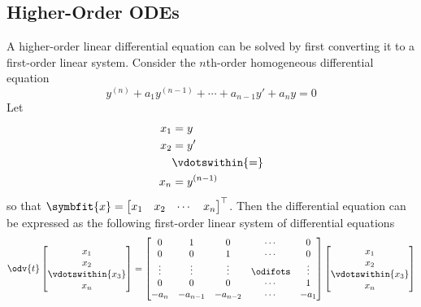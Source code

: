 \documentclass{article}
\begin{document}
\subsection{Higher-Order ODEs}
A higher-order linear differential equation can be solved by first converting it to a first-order linear
system. Consider the \(n\)th-order homogeneous differential equation
\begin{equation*}
    y^{\left( n \right)} + a_1 y^{\left( n-1 \right)} + \cdots + a_{n-1} y' + a_n y = 0
\end{equation*}
Let
\begin{align*}
    x_1 & = y                      \\
    x_2 & = y'                     \\
        & \vdotswithin{=}          \\
    x_n & = y^{\left( n-1 \right)}
\end{align*}
so that \(\symbfit{x}=\begin{bmatrix}x_1 & x_2 & \cdots & x_n\end{bmatrix}^\top \). Then the differential equation can
be expressed as the following first-order linear system of differential equations
\begin{equation*}
    \odv{t} \begin{bmatrix}
        x_1               \\
        x_2               \\
        \vdotswithin{x_3} \\
        x_n
    \end{bmatrix} = \begin{bmatrix}
        0      & 1        & 0        & \cdots & 0      \\
        0      & 0        & 1        & \cdots & 0      \\
        \vdots & \vdots   & \vdots   & \odifots & \vdots \\
        0      & 0        & 0        & \cdots & 1      \\
        -a_n   & -a_{n-1} & -a_{n-2} & \cdots & -a_1
    \end{bmatrix} \begin{bmatrix}
        x_1               \\
        x_2               \\
        \vdotswithin{x_3} \\
        x_n
    \end{bmatrix}
\end{equation*}
\end{document}
